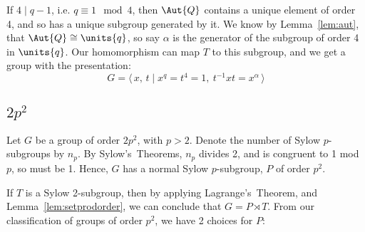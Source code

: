 \begin{enumerate}
        If \(4 \mid q-1\), i.e. \(q \equiv 1 \mod{4}\), then \(\Aut{Q}\) contains a unique element of order 4, and so
        has a unique subgroup generated by it.
        We know by Lemma~\ref{lem:aut}, that \(\Aut{Q} \cong \units{q}\), so say \(\alpha\) is the generator of the
        subgroup of order 4 in \(\units{q}\).
        Our homomorphism can map \(T\) to this subgroup, and we get a group with the presentation:
        \[G = \langle\, x,\,t \mid x^q = t^4 = 1,\ t^{-1}xt = x^{\alpha}\,\rangle\]

\end{enumerate}

\subsection{\(2p^2\)}
Let \(G\) be a group of order \(2p^2\), with \(p > 2\).
Denote the number of Sylow \(p\)-subgroups by \(n_p\).
By Sylow's~Theorems, \(n_p\) divides 2, and is congruent to 1 mod \(p\), so must be 1.
Hence, \(G\) has a normal Sylow \(p\)-subgroup, \(P\) of order \(p^2\).

If \(T\) is a Sylow 2-subgroup, then by applying Lagrange's~Theorem, and Lemma~\ref{lem:setprodorder}, we can conclude
that \(G = P \rtimes T\).
From our classification of groups of order \(p^2\), we have 2 choices for \(P\):

